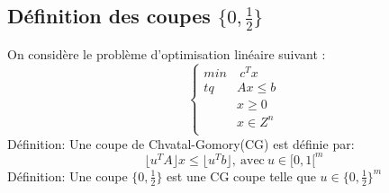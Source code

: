 \documentclass[12pt]{report}
\begin{document}
\subsection{Définition des coupes $\{0,\frac{1}{2}\}$}
On considère le problème d'optimisation linéaire suivant :
$$
\left\{
    \begin{array}{ll}
        min& \ c^Tx \\
        tq &  Ax \le b \\
          & x \ge 0 \\
          & x \in Z^n \\
    \end{array}
\right.
$$
Définition: Une coupe de Chvatal-Gomory(CG) est définie par:
$$
\lfloor u^TA \rfloor x \le \lfloor u^Tb \rfloor, \ \mbox{avec} \ u \in [0,1[^m
$$
Définition: Une coupe $\{0,\frac{1}{2}\}$ est une CG coupe telle que $u \in \{0,\frac{1}{2}\}^m$
\end{document}
